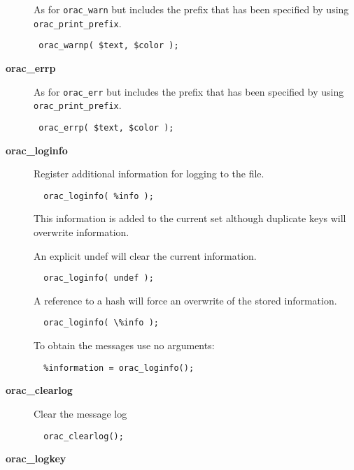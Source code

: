 \begin{description}
As for \texttt{orac\_warn} but includes the prefix that has been specified
by using \texttt{orac\_print\_prefix}.

\begin{verbatim}
 orac_warnp( $text, $color );
\end{verbatim}

\item[{\textbf{orac\_errp}}] \mbox{}

As for \texttt{orac\_err} but includes the prefix that has been specified
by using \texttt{orac\_print\_prefix}.

\begin{verbatim}
 orac_errp( $text, $color );
\end{verbatim}

\item[{\textbf{orac\_loginfo}}] \mbox{}

Register additional information for logging to the file.

\begin{verbatim}
  orac_loginfo( %info );
\end{verbatim}


This information is added to the current set although duplicate keys will
overwrite information.



An explicit undef will clear the current information.

\begin{verbatim}
  orac_loginfo( undef );
\end{verbatim}


A reference to a hash will force an overwrite of the stored information.

\begin{verbatim}
  orac_loginfo( \%info );
\end{verbatim}


To obtain the messages use no arguments:

\begin{verbatim}
  %information = orac_loginfo();
\end{verbatim}

\item[{\textbf{orac\_clearlog}}] \mbox{}

Clear the message log

\begin{verbatim}
  orac_clearlog();
\end{verbatim}

\item[{\textbf{orac\_logkey}}] \mbox{}


\end{description}
